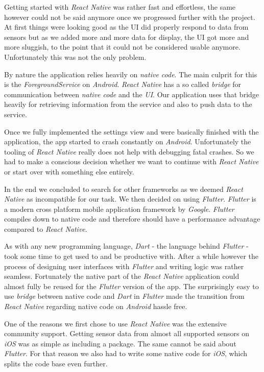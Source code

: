 Getting started with \textit{React Native} was rather fast and effortless, the same however could
not be said anymore once we progressed further with the project. At first things were looking good
as the UI did properly respond to data from sensors but as we added more and more data for
display, the UI got more and more sluggish, to the point that it could not be considered usable
anymore. Unfortunately this was not the only problem.

By nature the application relies heavily on \textit{native code}. The main culprit for this is the
\textit{ForegroundService} on \textit{Android}. \textit{React Native} has a so called
\textit{bridge} for communication between \textit{native code} and the \textit{UI}. Our application
uses that bridge heavily for retrieving information from the service and also to push data to the
service.

Once we fully implemented the settings view and were basically finished with the application, the
app started to crash constantly on \textit{Android}. Unfortunately the tooling of \textit{React
Native} really does not help with debugging fatal crashes. So we had to make a conscious decision
whether we want to continue with \textit{React Native} or start over with something else entirely.

In the end we concluded to search for other frameworks as we deemed \textit{React Native} as
incompatible for our task. We then decided on using \textit{Flutter}. \textit{Flutter} is a modern
cross platform mobile application framework by \textit{Google}. \textit{Flutter} compiles down to
native code and therefore should have a performance advantage compared to \textit{React Native}.

As with any new programming language, \textit{Dart} - the language behind \textit{Flutter} - took
some time to get used to and be productive with. After a while however the process of designing user
interfaces with \textit{Flutter} and writing logic was rather seamless. Fortunately the native part
of the \textit{React Native} application could almost fully be reused for the \textit{Flutter}
version of the app. The surprisingly easy to use \textit{bridge} between native code and
\textit{Dart} in \textit{Flutter} made the transition from \textit{React Native} regarding native
code on \textit{Android} hassle free.

One of the reasons we first chose to use \textit{React Native} was the extensive community support.
Getting sensor data from almost all supported sensors on \textit{iOS} was as simple as including a
package. The same cannot be said about \textit{Flutter}. For that reason we also had to write some
native code for \textit{iOS}, which splits the code base even further.

